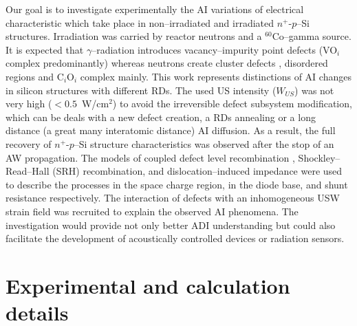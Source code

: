 \documentclass[aip,jap, amsmath,amssymb,reprint]{revtex4-1}
\begin{document}
Our goal is to investigate experimentally the AI variations of electrical characteristic which take place in non--irradiated and irradiated $n^+$-$p$--Si structures.
Irradiation was carried by reactor neutrons and a $^{60}$Co--gamma source.
It is expected that $\gamma$--radiation introduces vacancy--impurity point defects (VO$_i$ complex predominantly) \cite{NIEL:Jafari,Gamma:Prabhakara,NIEL:Moll}
whereas neutrons create cluster defects \cite{Rew:Srour,Pintilie}, disordered regions \cite{Neutron:Arutyunov} and C$_i$O$_i$ complex  \cite{NIEL:Moll,neutron:Londos} mainly.
This work represents distinctions of AI changes in silicon structures with different RDs.
The used US intensity ($W_{U\!S}$) was not very high ($<0.5$~W/cm$^2$) to avoid the irreversible defect subsystem modification, which can be deals with a new defect creation, a RDs annealing or a long distance (a great many interatomic distance) AI diffusion.
As a result, the full recovery of $n^+$-$p$--Si structure characteristics was observed after the stop of an AW propagation.
The models of coupled defect level recombination \cite{CDLR:JAP1995,CDLR:JAP}, Shockley--Read--Hall (SRH) recombination, and dislocation--induced impedance \cite{Rsh:Gopal2003,Rsh:Gopal2004} were used to describe the processes in the space charge region,  in the diode base, and shunt resistance respectively.
The interaction of defects with an inhomogeneous USW strain field \cite{MirzadeJAP2011,PeleshchakUJF2016} was recruited to explain the observed AI phenomena.
The investigation would provide not only better ADI understanding but could also facilitate the development of acoustically controlled devices or radiation sensors.



\section{Experimental and calculation details}
\end{document}
